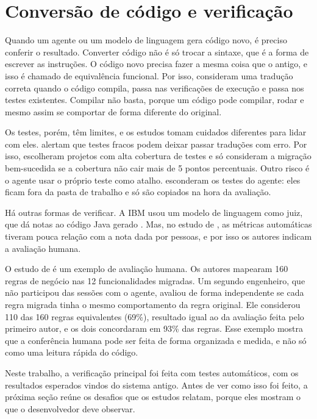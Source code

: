 \section{Conversão de código e verificação}

Quando um agente ou um modelo de linguagem gera código novo, é preciso conferir o resultado. Converter código não é só trocar a sintaxe, que é a forma de escrever as instruções. O código novo precisa fazer a mesma coisa que o antigo, e isso é chamado de equivalência funcional. Por isso,  consideram uma tradução correta quando o código compila, passa nas verificações de execução e passa nos testes existentes. Compilar não basta, porque um código pode compilar, rodar e mesmo assim se comportar de forma diferente do original.

Os testes, porém, têm limites, e os estudos tomam cuidados diferentes para lidar com eles.  alertam que testes fracos podem deixar passar traduções com erro. Por isso,  escolheram projetos com alta cobertura de testes e só consideram a migração bem-sucedida se a cobertura não cair mais de 5 pontos percentuais. Outro risco é o agente usar o próprio teste como atalho.  esconderam os testes do agente: eles ficam fora da pasta de trabalho e só são copiados na hora da avaliação.

Há outras formas de verificar. A IBM usou um modelo de linguagem como juiz, que dá notas ao código Java gerado \cite{chakaravarthy2026cobol}. Mas, no estudo de , as métricas automáticas tiveram pouca relação com a nota dada por pessoas, e por isso os autores indicam a avaliação humana.

O estudo de  é um exemplo de avaliação humana. Os autores mapearam 160 regras de negócio nas 12 funcionalidades migradas. Um segundo engenheiro, que não participou das sessões com o agente, avaliou de forma independente se cada regra migrada tinha o mesmo comportamento da regra original. Ele considerou 110 das 160 regras equivalentes (69\%), resultado igual ao da avaliação feita pelo primeiro autor, e os dois concordaram em 93\% das regras. Esse exemplo mostra que a conferência humana pode ser feita de forma organizada e medida, e não só como uma leitura rápida do código.

Neste trabalho, a verificação principal foi feita com testes automáticos, com os resultados esperados vindos do sistema antigo. Antes de ver como isso foi feito, a próxima seção reúne os desafios que os estudos relatam, porque eles mostram o que o desenvolvedor deve observar.
